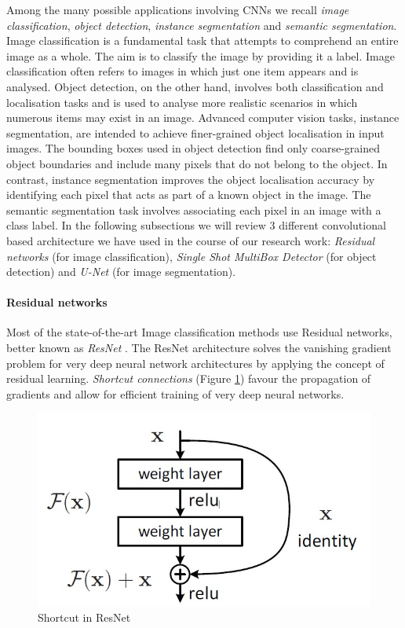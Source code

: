 Among the many possible applications involving CNNs we recall \textit{image classification}, \textit{object detection}, \textit{instance segmentation} and \textit{semantic segmentation}. Image classification is a fundamental task that attempts to comprehend an entire image as a whole. The aim is to classify the image by providing it a label. Image classification often refers to images in which just one item appears and is analysed. Object detection, on the other hand, involves both classification and localisation tasks and is used to analyse more realistic scenarios in which numerous items may exist in an image. Advanced computer vision tasks, instance segmentation, are intended to achieve finer-grained object localisation in input images. The bounding boxes used in object detection find only coarse-grained object boundaries and include many pixels that do not belong to the object. In contrast, instance segmentation improves the object localisation accuracy by identifying each pixel that acts as part of a known object in the image. The semantic segmentation task involves associating each pixel in an image with a class label. In the following subsections we will review 3 different convolutional based architecture we have used in the course of our research work: \textit{Residual networks} (for image classification), \textit{Single Shot MultiBox Detector} (for object detection) and \textit{U-Net} (for image segmentation).

\paragraph{Residual networks} \label{Residual Networks}

Most of the state-of-the-art Image classification methods use Residual networks, better known as \textit{ResNet} \citep{he2016deep}. The ResNet architecture solves the vanishing gradient problem for very deep neural network architectures by applying the concept of residual learning. \textit{Shortcut connections} (Figure \ref{fig:shortcut}) favour the propagation of gradients and allow for efficient training of very deep neural networks.

\begin{figure}
\centerline{\includegraphics[scale=0.5]{images/chapter_2/residual_learning.jpg}}
\caption{Shortcut in ResNet \citep[from][]{he2016deep}}
\label{fig:shortcut}
\end{figure}

